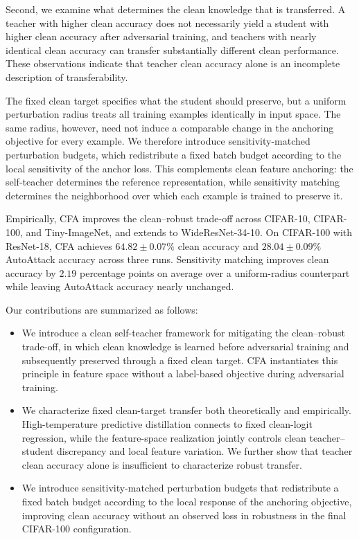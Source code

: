 \documentclass{article} %
\theoremstyle{plain}
\begin{document}
Second, we examine what determines the clean knowledge that is transferred.
A teacher with higher clean accuracy does not necessarily yield a student
with higher clean accuracy after adversarial training, and teachers with
nearly identical clean accuracy can transfer substantially different clean
performance. These observations indicate that teacher clean accuracy alone
is an incomplete description of transferability.

The fixed clean target specifies what the student should preserve, but a
uniform perturbation radius treats all training examples identically in input
space. The same radius, however, need not induce a comparable change in the
anchoring objective for every example. We therefore introduce
sensitivity-matched perturbation budgets, which redistribute a fixed batch
budget according to the local sensitivity of the anchor loss. This
complements clean feature anchoring: the self-teacher determines the reference
representation, while sensitivity matching determines the neighborhood over
which each example is trained to preserve it.

Empirically, CFA improves the clean--robust trade-off across CIFAR-10,
CIFAR-100, and Tiny-ImageNet, and extends to WideResNet-34-10. On CIFAR-100
with ResNet-18, CFA achieves \(64.82\mathbin{\pm}0.07\%\) clean accuracy and
\(28.04\mathbin{\pm}0.09\%\) AutoAttack accuracy across three runs.
Sensitivity matching improves clean accuracy by \(2.19\) percentage points on
average over a uniform-radius counterpart while leaving AutoAttack accuracy
nearly unchanged.

Our contributions are summarized as follows:
\begin{itemize}
  \item We introduce a clean self-teacher framework for mitigating the
  clean--robust trade-off, in which clean knowledge is learned before
  adversarial training and subsequently preserved through a fixed clean
  target. CFA instantiates this principle in feature space without a
  label-based objective during adversarial training.
  \item We characterize fixed clean-target transfer both theoretically and
  empirically. High-temperature predictive distillation connects to fixed
  clean-logit regression, while the feature-space realization jointly
  controls clean teacher--student discrepancy and local feature variation.
  We further show that teacher clean accuracy alone is insufficient to
  characterize robust transfer.
  \item We introduce sensitivity-matched perturbation budgets that
  redistribute a fixed batch budget according to the local response of the
  anchoring objective, improving clean accuracy without an observed loss in
  robustness in the final CIFAR-100 configuration.
\end{itemize}
\end{document}
